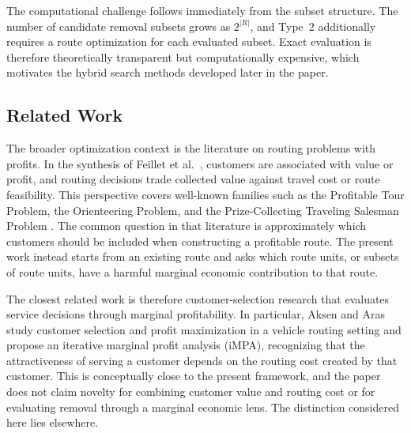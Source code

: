 \documentclass[preprint,12pt]{elsarticle}
\begin{document}
The computational challenge follows immediately from the subset structure. The number of candidate removal subsets grows as $2^{|R|}$, and Type~2 additionally requires a route optimization for each evaluated subset. Exact evaluation is therefore theoretically transparent but computationally expensive, which motivates the hybrid search methods developed later in the paper.

\subsection{Related Work}
\label{subsec:related-work}

The broader optimization context is the literature on routing problems with profits. In the synthesis of Feillet et al.~\cite{feillet2005tsp_profits}, customers are associated with value or profit, and routing decisions trade collected value against travel cost or route feasibility. This perspective covers well-known families such as the Profitable Tour Problem, the Orienteering Problem, and the Prize-Collecting Traveling Salesman Problem \cite{balas1989prize,feillet2005tsp_profits,chao1996team_orienteering}. The common question in that literature is approximately which customers should be included when constructing a profitable route. The present work instead starts from an existing route and asks which route units, or subsets of route units, have a harmful marginal economic contribution to that route.

The closest related work is therefore customer-selection research that evaluates service decisions through marginal profitability. In particular, Aksen and Aras~\cite{aksen2006customer_selection} study customer selection and profit maximization in a vehicle routing setting and propose an iterative marginal profit analysis (iMPA), recognizing that the attractiveness of serving a customer depends on the routing cost created by that customer. This is conceptually close to the present framework, and the paper does not claim novelty for combining customer value and routing cost or for evaluating removal through a marginal economic lens. The distinction considered here lies elsewhere.
\end{document}
